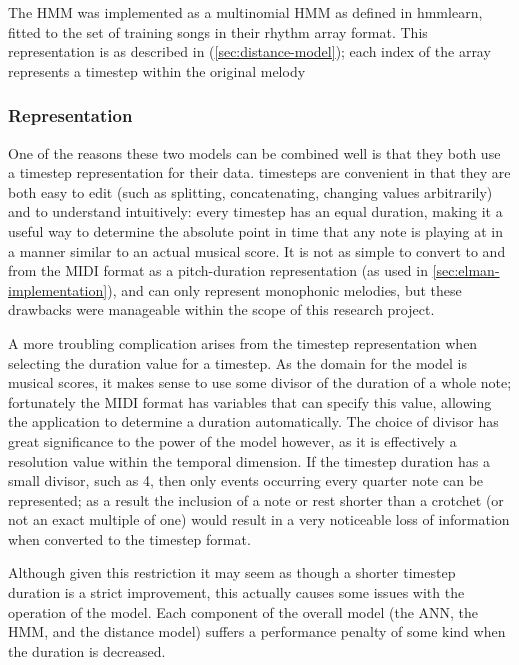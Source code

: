 \documentclass[ author={Stephen Livermore-Tozer},
				supervisor={Dr. Peter Flach},
				degree={MEng},
				title={Performing Algorithmic Co-composition Using Machine Learning},
				subtitle={},
				type={research},
				year={2016} ]{dissertation}
\begin{document}
	The HMM was implemented as a multinomial HMM as defined in hmmlearn, fitted to the set of training songs in their rhythm array format. This representation is as described in (\ref{sec:distance-model}); each index of the array represents a timestep within the original melody 
	
	\subsubsection{Representation}
	
	One of the reasons these two models can be combined well is that they both use a timestep representation for their data. timesteps are convenient in that they are both easy to edit (such as splitting, concatenating, changing values arbitrarily) and to understand intuitively: every timestep has an equal duration, making it a useful way to determine the absolute point in time that any note is playing at in a manner similar to an actual musical score. It is not as simple to convert to and from the MIDI format as a pitch-duration representation (as used in \ref{sec:elman-implementation}), and can only represent monophonic melodies, but these drawbacks were manageable within the scope of this research project.
	
	A more troubling complication arises from the timestep representation when selecting the duration value for a timestep. As the domain for the model is musical scores, it makes sense to use some divisor of the duration of a whole note; fortunately the MIDI format has variables that can specify this value, allowing the application to determine a duration automatically. The choice of divisor has great significance to the power of the model however, as it is effectively a resolution value within the temporal dimension. If the timestep duration has a small divisor, such as 4, then only events occurring every quarter note can be represented; as a result the inclusion of a note or rest shorter than a crotchet (or not an exact multiple of one) would result in a very noticeable loss of information when converted to the timestep format. 
	
	
	Although given this restriction it may seem as though a shorter timestep duration is a strict improvement, this actually causes some issues with the operation of the model. Each component of the overall model (the ANN, the HMM, and the distance model) suffers a performance penalty of some kind when the duration is decreased.
	
\end{document}
